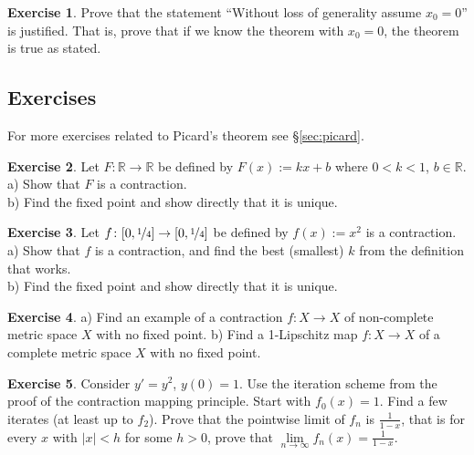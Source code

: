 \documentclass[12pt]{book}
\newcommand{\abs}[1]{\left\lvert {#1} \right\rvert}
\newcommand{\R}{{\mathbb{R}}}
\theoremstyle{plain}
\theoremstyle{remark}
\theoremstyle{definition}
\newenvironment{exnote}{\small}{}
\theoremstyle{exercise}
\newtheorem{exercise}{Exercise}[section]
\theoremstyle{example}
\newcommand{\sectionref}[1]{\hyperref[#1]{\S\ref*{#1}}}
\begin{document}
\begin{exercise}
Prove that the statement ``Without loss of generality assume $x_0 = 0$'' is
justified.  That is, prove that if we know the theorem with $x_0 = 0$, the
theorem is true as stated.
\end{exercise}

\subsection{Exercises}

\begin{exnote}
For more exercises related to Picard's theorem see \sectionref{sec:picard}.
\end{exnote}

\begin{exercise}
Let $F \colon \R \to \R$ be defined by
$F(x) := kx + b$ where $0 < k < 1$, $b \in \R$.\\
a) Show that $F$ is a contraction.\\
b) Find the fixed
point and show directly that it is unique.
\end{exercise}

\begin{exercise}
Let $f \colon [0,\nicefrac{1}{4}] \to [0,\nicefrac{1}{4}]$ be defined by
$f(x) := x^2$ is a contraction.\\
a) Show that $f$
is a contraction, and find the best (smallest) $k$ from the definition that works.\\
b) Find the fixed point and show directly that it is unique.
\end{exercise}

\begin{exercise} \label{exercise:nofixedpoint}
a) Find an example of a contraction $f \colon X \to X$
of non-complete metric space $X$ with no
fixed point.
b) Find a 1-Lipschitz map $f \colon X \to X$ of a complete metric space $X$ with no fixed point.
\end{exercise}

\begin{exercise}
Consider $y' =y^2$, $y(0)=1$.  Use the iteration scheme
from the proof of the contraction mapping principle.
Start with $f_0(x) = 1$.  Find a 
few iterates (at least up to $f_2$).  Prove that
the pointwise limit of $f_n$ is $\frac{1}{1-x}$, that is for every $x$
with $\abs{x} < h$ for some $h > 0$,
prove that $\lim\limits_{n\to\infty}f_n(x) = \frac{1}{1-x}$.
\end{exercise}
\end{document}
